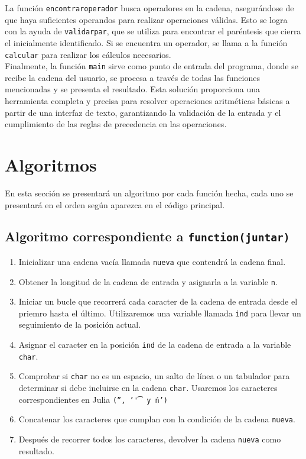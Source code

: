 \documentclass{article}
\begin{document}
La función \texttt{encontrar\textunderscore operador} busca operadores en la cadena, asegurándose de que haya suficientes operandos para realizar operaciones válidas. Esto se logra con la ayuda de \texttt{validar\textunderscore par}, que se utiliza para encontrar el paréntesis que cierra el inicialmente identificado. Si se encuentra un operador, se llama a la función \texttt{calcular} para realizar los cálculos necesarios.\\

Finalmente, la función \texttt{main} sirve como punto de entrada del programa, donde se recibe la cadena del usuario, se procesa a través de todas las funciones mencionadas y se presenta el resultado. Esta solución proporciona una herramienta completa y precisa para resolver operaciones aritméticas básicas a partir de una interfaz de texto, garantizando la validación de la entrada y el cumplimiento de las reglas de precedencia en las operaciones.\\

\section{Algoritmos}
En esta sección se presentará un algoritmo por cada función hecha, cada uno se presentará en el orden según aparezca en el código principal.

\subsection{Algoritmo correspondiente a \texttt{function(juntar)}}
\begin{enumerate}
    \item Inicializar una cadena vacía llamada \texttt{nueva} que contendrá la cadena final.

    \item Obtener la longitud de la cadena de entrada y asignarla a la variable \texttt{n}.

    \item Iniciar un bucle que recorrerá cada caracter de la cadena de entrada desde el priemro hasta el último. Utilizaremos una variable llamada \texttt{ind} para llevar un seguimiento de la posición actual. 

    \item Asignar el caracter en la posición \texttt{ind} de la cadena de entrada a la variable \texttt{char}.

    \item Comprobar si \texttt{char} no es un espacio, un salto de línea o un tabulador para determinar si debe incluirse en la cadena \texttt{char}. Usaremos los caracteres correspondientes en Julia \texttt{('', '\t' y \'n')}

    \item Concatenar los caracteres que cumplan con la condición de la cadena \texttt{nueva}.

    \item Después de recorrer todos los caracteres, devolver la cadena \texttt{nueva} como resultado.\\
\end{enumerate}
\end{document}
